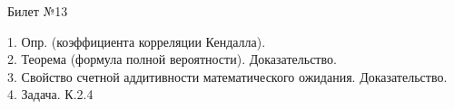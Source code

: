 \documentclass[preview]{standalone}
\begin{document}
 
\begin{center} {\Large Билет №13} \end{center} 

1.  Опр. (коэффициента корреляции Кендалла).\\

2.  Теорема (формула полной вероятности). Доказательство.\\

3.   Свойство счетной аддитивности математического ожидания. Доказательство.\\

4. Задача. К.2.4\\
\end{document}

